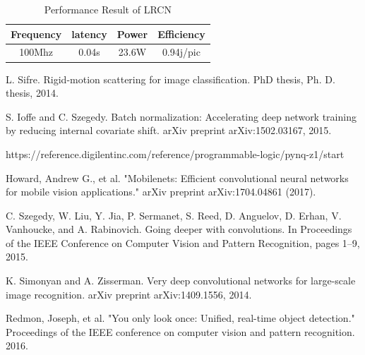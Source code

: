\documentclass[a4paper, 11pt]{article}
\begin{document}
\begin{table}[h]
\centering
\caption{Performance Result of LRCN\vspace{-10pt}} \label{tab:perf_lrcn}
\setlength{\tabcolsep}{4pt}
\begin{tabular}{|c | c |  c| c|}
\hline 
Frequency & latency & Power & Efficiency \\
\hline
100Mhz & 0.04s & 23.6W & 0.94j/pic \\
\hline
\end{tabular}
\end{table}
    



\begin{thebibliography}{9}


L. Sifre. Rigid-motion scattering for image classification.
PhD thesis, Ph. D. thesis, 2014.

S. Ioffe and C. Szegedy. Batch normalization: Accelerating
deep network training by reducing internal covariate shift.
arXiv preprint arXiv:1502.03167, 2015.

https://reference.digilentinc.com/reference/programmable-logic/pynq-z1/start

Howard, Andrew G., et al. "Mobilenets: Efficient convolutional neural networks for mobile vision applications." arXiv preprint arXiv:1704.04861 (2017).

C. Szegedy, W. Liu, Y. Jia, P. Sermanet, S. Reed,
D. Anguelov, D. Erhan, V. Vanhoucke, and A. Rabinovich.
Going deeper with convolutions. In Proceedings of the IEEE
Conference on Computer Vision and Pattern Recognition,
pages 1–9, 2015.

K. Simonyan and A. Zisserman. Very deep convolutional
networks for large-scale image recognition. arXiv preprint
arXiv:1409.1556, 2014.

Redmon, Joseph, et al. "You only look once: Unified, real-time object detection." Proceedings of the IEEE conference on computer vision and pattern recognition. 2016.


\end{thebibliography}
\end{document}
